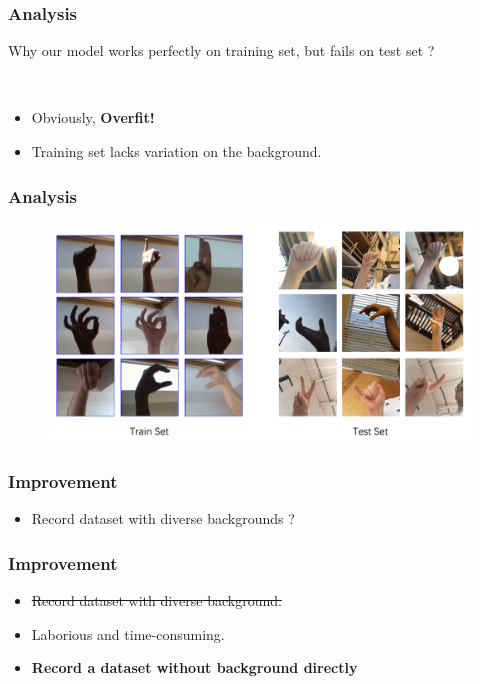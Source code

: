 \documentclass[handout]{beamer}
\begin{document}
\begin{frame}
\frametitle{Analysis}

\begin{block}

Why our model works perfectly on training set, but fails on test set ?

\end{block}

\
\

\begin{itemize}
	\item Obviously, \textbf{Overfit!}
	\item Training set lacks variation on the background.

\end{itemize}

\end{frame}

\begin{frame}
\frametitle{Analysis}

\begin{figure}[h]
\begin{center}
\includegraphics[width=1\linewidth]{imgs/asl-cmp}
\end{center}
\end{figure}

\end{frame}

\begin{frame}
\frametitle{Improvement}

\begin{itemize}
	\item Record dataset with diverse backgrounds ?
\end{itemize}

\end{frame}

\begin{frame}
\frametitle{Improvement}

\begin{itemize}[<+->]
	\item \sout{Record dataset with diverse background.}
	\item Laborious and time-consuming.
	\item \textbf{Record a dataset without background directly}
\end{itemize}

\end{frame}
\end{document}
